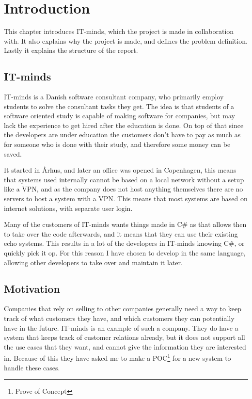 \chapter{Introduction}
\label{chap:Introduction}
This chapter introduces IT-minds, which the project is made in collaboration with.
It also explains why the project is made, and defines the problem definition.
Lastly it explains the structure of the report.

\section{IT-minds}
\label{sec:IT-minds}
IT-minds is a Danish software consultant company\cite{IT-minds}, who primarily employ students
to solve the consultant tasks they get. The idea is that students of a software oriented
study is capable of making software for companies, but may lack the experience to get hired
after the education is done. On top of that since the developers are under education
the customers don't have to pay as much as for someone who is done with their study,
and therefore some money can be saved.

It started in Århus, and later an office was opened in Copenhagen, this means that systems
used internally cannot be based on a local network without a setup like a VPN, and as
the company does not host anything themselves there are no servers to host a system with
a VPN. This means that most systems are based on internet solutions, with separate user login.

Many of the customers of IT-minds wants things made in C\# as that allows then to
take over the code afterwards, and it means that they can use their existing echo
systems. This results in a lot of the developers in IT-minds knowing C\#, or
quickly pick it op. For this reason I have chosen to develop in the same language,
allowing other developers to take over and maintain it later.

\section{Motivation}
\label{sec:Motivation}
Companies that rely on selling to other companies generally need a way to keep track of
what customers they have, and which customers they can potentially have in the future.
IT-minds is an example of such a company. They do have a system that keeps track
of customer relations already, but it does not support all the use cases that they want,
and cannot give the information they are interested in.
Because of this they have asked me to make a POC\footnote{Prove of Concept} for a new
system to handle these cases.

